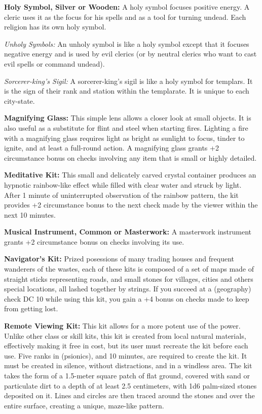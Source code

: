 \textbf{Holy Symbol, Silver or Wooden:} A holy symbol focuses positive energy. A cleric uses it as the focus for his spells and as a tool for turning undead. Each religion has its own holy symbol.

 \textit{Unholy Symbols:} An unholy symbol is like a holy symbol except that it focuses negative energy and is used by evil clerics (or by neutral clerics who want to cast evil spells or command undead).

 \textit{Sorcerer-king's Sigil:} A sorcerer-king's sigil is like a holy symbol for templars. It is the sign of their rank and station within the templarate. It is unique to each city-state.

\textbf{Magnifying Glass:} This simple lens allows a closer look at small objects. It is also useful as a substitute for flint and steel when starting fires. Lighting a fire with a magnifying glass requires light as bright as sunlight to focus, tinder to ignite, and at least a full-round action. A magnifying glass grants +2 circumstance bonus on  checks involving any item that is small or highly detailed.

\textbf{Meditative Kit:} This small and delicately carved crystal container produces an hypnotic rainbow-like effect while filled with clear water and struck by light. After 1 minute of uninterrupted observation of the rainbow pattern, the kit provides +2 circumstance bonus to the next  check made by the viewer within the next 10 minutes.

\textbf{Musical Instrument, Common or Masterwork:} A masterwork instrument grants +2 circumstance bonus on  checks involving its use.

\textbf{Navigator's Kit:} Prized posessions of many trading houses and frequent wanderers of the wastes, each of these kits is composed of a set of maps made of straight sticks representing roads, and small stones for villages, cities and others special locations, all lashed together by strings. If you succeed at a  (geography) check DC 10 while using this kit, you gain a +4 bonus on  checks made to keep from getting lost.

\textbf{Remote Viewing Kit:} This kit allows for a more potent use of the  power. Unlike other class or skill kits, this kit is created from local natural materials, effectively making it free in cost, but its user must recreate the kit before each use. Five ranks in  (psionics), and 10 minutes, are required to create the kit. It must be created in silence, without distractions, and in a windless area. The kit takes the form of a 1.5-meter square patch of flat ground, covered with sand or particulate dirt to a depth of at least 2.5 centimeters, with 1d6 palm-sized stones deposited on it. Lines and circles are then traced around the stones and over the entire surface, creating a unique, maze-like pattern.

